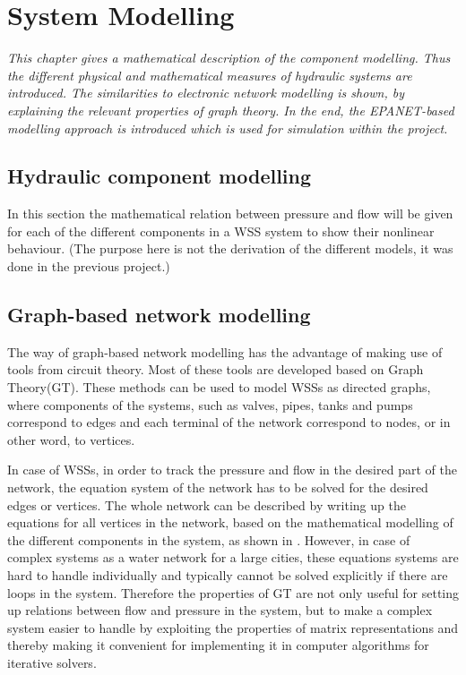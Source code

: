 \chapter{System Modelling}
\label{system_modelling}

\emph{This chapter gives a mathematical description of the component modelling. Thus the different physical and mathematical measures of hydraulic systems are introduced. The similarities to electronic network modelling is shown, by explaining the relevant properties of graph theory. In the end, the EPANET-based modelling approach is introduced which is used for simulation within the project.}

\section{Hydraulic component modelling}
\label{hydraulic_component_modelling}

In this section the mathematical relation between pressure and flow will be given for each of the different components in a WSS system to show their nonlinear behaviour. (The purpose here is not the derivation of the different models, it was done in the previous project.)

\section{Graph-based network modelling}
\label{graph_based_network_modelling}

The way of graph-based network modelling has the advantage of making use of tools from circuit theory. Most of these tools are developed based on Graph Theory(GT). These methods can be used to model WSSs as directed graphs, where components of the systems, such as valves, pipes, tanks and pumps correspond to edges and each terminal of the network correspond to nodes, or in other word, to vertices. 

In case of WSSs, in order to track the pressure and flow in the desired part of the network, the equation system of the network has to be solved for the desired edges or vertices. The whole network can be described by writing up the equations for all vertices in the network, based on the mathematical modelling of the different components in the system, as shown in . However, in case of complex systems as a water network for a large cities, these equations systems are hard to handle individually and typically cannot be solved explicitly if there are loops in the system. Therefore the properties of GT are not only useful for setting up relations between flow and pressure in the system, but to make a complex system easier to handle by exploiting the properties of matrix representations and thereby making it convenient for implementing it in computer algorithms for iterative solvers.  


